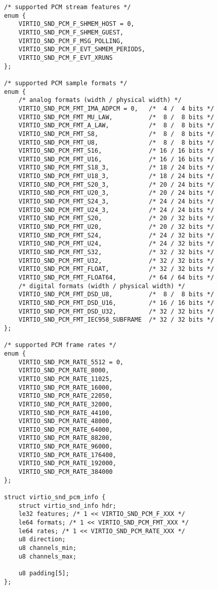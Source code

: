 \begin{lstlisting}
/* supported PCM stream features */
enum {
    VIRTIO_SND_PCM_F_SHMEM_HOST = 0,
    VIRTIO_SND_PCM_F_SHMEM_GUEST,
    VIRTIO_SND_PCM_F_MSG_POLLING,
    VIRTIO_SND_PCM_F_EVT_SHMEM_PERIODS,
    VIRTIO_SND_PCM_F_EVT_XRUNS
};

/* supported PCM sample formats */
enum {
    /* analog formats (width / physical width) */
    VIRTIO_SND_PCM_FMT_IMA_ADPCM = 0,   /*  4 /  4 bits */
    VIRTIO_SND_PCM_FMT_MU_LAW,          /*  8 /  8 bits */
    VIRTIO_SND_PCM_FMT_A_LAW,           /*  8 /  8 bits */
    VIRTIO_SND_PCM_FMT_S8,              /*  8 /  8 bits */
    VIRTIO_SND_PCM_FMT_U8,              /*  8 /  8 bits */
    VIRTIO_SND_PCM_FMT_S16,             /* 16 / 16 bits */
    VIRTIO_SND_PCM_FMT_U16,             /* 16 / 16 bits */
    VIRTIO_SND_PCM_FMT_S18_3,           /* 18 / 24 bits */
    VIRTIO_SND_PCM_FMT_U18_3,           /* 18 / 24 bits */
    VIRTIO_SND_PCM_FMT_S20_3,           /* 20 / 24 bits */
    VIRTIO_SND_PCM_FMT_U20_3,           /* 20 / 24 bits */
    VIRTIO_SND_PCM_FMT_S24_3,           /* 24 / 24 bits */
    VIRTIO_SND_PCM_FMT_U24_3,           /* 24 / 24 bits */
    VIRTIO_SND_PCM_FMT_S20,             /* 20 / 32 bits */
    VIRTIO_SND_PCM_FMT_U20,             /* 20 / 32 bits */
    VIRTIO_SND_PCM_FMT_S24,             /* 24 / 32 bits */
    VIRTIO_SND_PCM_FMT_U24,             /* 24 / 32 bits */
    VIRTIO_SND_PCM_FMT_S32,             /* 32 / 32 bits */
    VIRTIO_SND_PCM_FMT_U32,             /* 32 / 32 bits */
    VIRTIO_SND_PCM_FMT_FLOAT,           /* 32 / 32 bits */
    VIRTIO_SND_PCM_FMT_FLOAT64,         /* 64 / 64 bits */
    /* digital formats (width / physical width) */
    VIRTIO_SND_PCM_FMT_DSD_U8,          /*  8 /  8 bits */
    VIRTIO_SND_PCM_FMT_DSD_U16,         /* 16 / 16 bits */
    VIRTIO_SND_PCM_FMT_DSD_U32,         /* 32 / 32 bits */
    VIRTIO_SND_PCM_FMT_IEC958_SUBFRAME  /* 32 / 32 bits */
};

/* supported PCM frame rates */
enum {
    VIRTIO_SND_PCM_RATE_5512 = 0,
    VIRTIO_SND_PCM_RATE_8000,
    VIRTIO_SND_PCM_RATE_11025,
    VIRTIO_SND_PCM_RATE_16000,
    VIRTIO_SND_PCM_RATE_22050,
    VIRTIO_SND_PCM_RATE_32000,
    VIRTIO_SND_PCM_RATE_44100,
    VIRTIO_SND_PCM_RATE_48000,
    VIRTIO_SND_PCM_RATE_64000,
    VIRTIO_SND_PCM_RATE_88200,
    VIRTIO_SND_PCM_RATE_96000,
    VIRTIO_SND_PCM_RATE_176400,
    VIRTIO_SND_PCM_RATE_192000,
    VIRTIO_SND_PCM_RATE_384000
};

struct virtio_snd_pcm_info {
    struct virtio_snd_info hdr;
    le32 features; /* 1 << VIRTIO_SND_PCM_F_XXX */
    le64 formats; /* 1 << VIRTIO_SND_PCM_FMT_XXX */
    le64 rates; /* 1 << VIRTIO_SND_PCM_RATE_XXX */
    u8 direction;
    u8 channels_min;
    u8 channels_max;

    u8 padding[5];
};
\end{lstlisting}

